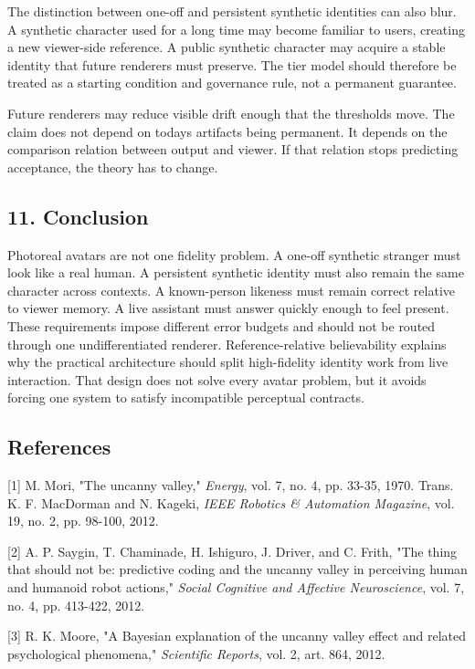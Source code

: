 \documentclass[
]{article}
\begin{document}
The distinction between one-off and persistent synthetic identities can
also blur. A synthetic character used for a long time may become
familiar to users, creating a new viewer-side reference. A public
synthetic character may acquire a stable identity that future renderers
must preserve. The tier model should therefore be treated as a starting
condition and governance rule, not a permanent guarantee.

Future renderers may reduce visible drift enough that the thresholds
move. The claim does not depend on today\textquotesingle s artifacts
being permanent. It depends on the comparison relation between output
and viewer. If that relation stops predicting acceptance, the theory has
to change.

\subsection{11. Conclusion}\label{11-conclusion}

Photoreal avatars are not one fidelity problem. A one-off synthetic
stranger must look like a real human. A persistent synthetic identity
must also remain the same character across contexts. A known-person
likeness must remain correct relative to viewer memory. A live assistant
must answer quickly enough to feel present. These requirements impose
different error budgets and should not be routed through one
undifferentiated renderer. Reference-relative believability explains why
the practical architecture should split high-fidelity identity work from
live interaction. That design does not solve every avatar problem, but
it avoids forcing one system to satisfy incompatible perceptual
contracts.

\subsection{References}\label{references}

{[}1{]} M. Mori, "The uncanny valley," \emph{Energy}, vol. 7, no. 4, pp.
33-35, 1970. Trans. K. F. MacDorman and N. Kageki, \emph{IEEE Robotics
\& Automation Magazine}, vol. 19, no. 2, pp. 98-100, 2012.

{[}2{]} A. P. Saygin, T. Chaminade, H. Ishiguro, J. Driver, and C.
Frith, "The thing that should not be: predictive coding and the uncanny
valley in perceiving human and humanoid robot actions," \emph{Social
Cognitive and Affective Neuroscience}, vol. 7, no. 4, pp. 413-422, 2012.

{[}3{]} R. K. Moore, "A Bayesian explanation of the
\textquotesingle uncanny valley\textquotesingle{} effect and related
psychological phenomena," \emph{Scientific Reports}, vol. 2, art. 864,
2012.
\end{document}
